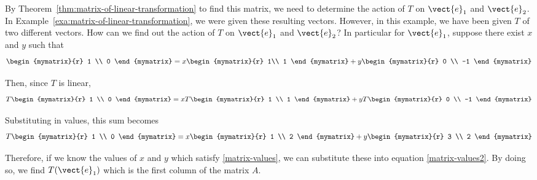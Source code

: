 \begin{solution} By Theorem~\ref{thm:matrix-of-linear-transformation} to find this matrix, we need to determine the action of $T$ on
$\vect{e}_{1}$ and $\vect{e}_{2}$. In Example~\ref{exa:matrix-of-linear-transformation}, we were given these resulting vectors.
However, in this example, we have been given $T$ of two different vectors. How can we find out the action
of $T$ on $\vect{e}_{1}$ and $\vect{e}_{2}$? In particular for $\vect{e}_{1}$, suppose there exist $x$ and $y$ such that
\begin{equation}
\begin{mymatrix}{r}
1 \\
0
\end{mymatrix} = x\begin{mymatrix}{r}
1\\
1
\end{mymatrix} +y\begin{mymatrix}{r}
0 \\
-1
\end{mymatrix}
\label{matrix-values}
\end{equation}

Then, since $T$ is linear,
\begin{equation*}
T\begin{mymatrix}{r}
1 \\
0
\end{mymatrix}  = x T\begin{mymatrix}{r}
1 \\
1
\end{mymatrix} +y T\begin{mymatrix}{r}
0 \\
-1
\end{mymatrix}
\end{equation*}

Substituting in values, this sum becomes
\begin{equation}
T\begin{mymatrix}{r}
1 \\
0
\end{mymatrix} =
 x\begin{mymatrix}{r}
1 \\
2
\end{mymatrix} +y\begin{mymatrix}{r}
3 \\
2
\end{mymatrix}
\label{matrix-values2}
\end{equation}

Therefore, if we know the values of $x$ and $y$ which satisfy {\eqref{matrix-values}}, we can substitute these into equation {\eqref{matrix-values2}}. By doing so,
we find $T(\vect{e}_1)$ which is the first column of the matrix $A$.


\end{solution}
